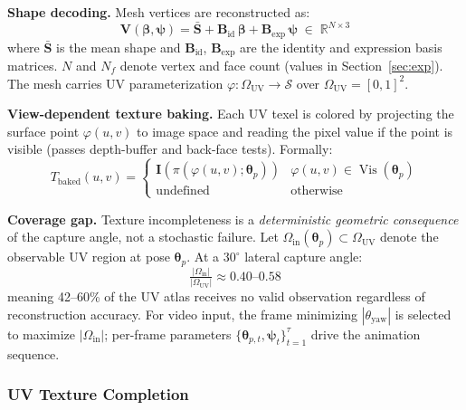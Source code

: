 \documentclass[conference]{IEEEtran}
\newcommand{\R}{\mathbb{R}}
\newcommand{\OUV}{\Omega_{\text{UV}}}
\newcommand{\Oin}{\Omega_{\text{in}}}
\newcommand{\Vis}{\operatorname{Vis}}
\newcommand{\Tbaked}{T_{\text{baked}}}
\begin{document}
\medskip\noindent\textbf{Shape decoding.}
Mesh vertices are reconstructed as:
\begin{equation}
  \mathbf{V}(\bm{\beta}, \bm{\psi}) = \bar{\mathbf{S}}
    + \mathbf{B}_{\text{id}}\,\bm{\beta} + \mathbf{B}_{\text{exp}}\,\bm{\psi}
  \;\in\; \R^{N \times 3}
  \label{eq:shape_decode}
\end{equation}
where $\bar{\mathbf{S}}$ is the mean shape and $\mathbf{B}_{\text{id}}$,
$\mathbf{B}_{\text{exp}}$ are the identity and expression basis matrices.
$N$ and $N_f$ denote vertex and face count (values in Section~\ref{sec:exp}).
The mesh carries UV parameterization $\varphi\colon \OUV \to \mathcal{S}$
over $\OUV = [0,1]^2$.

\medskip\noindent\textbf{View-dependent texture baking.}
Each UV texel is colored by projecting the surface point $\varphi(u,v)$ to
image space and reading the pixel value if the point is visible (passes
depth-buffer and back-face tests). Formally:
\begin{equation}
  \Tbaked(u,v) =
  \begin{cases}
    \mathbf{I}(\pi(\varphi(u,v);\bm{\theta}_p))
      & \varphi(u,v) \in \Vis(\bm{\theta}_p) \\
    \text{undefined} & \text{otherwise}
  \end{cases}
  \label{eq:baking}
\end{equation}

\medskip\noindent\textbf{Coverage gap.}
Texture incompleteness is a \emph{deterministic geometric consequence} of the
capture angle, not a stochastic failure. Let $\Oin(\bm{\theta}_p) \subset \OUV$
denote the observable UV region at pose $\bm{\theta}_p$. At a $30^{\circ}$
lateral capture angle:
\begin{equation}
  \tfrac{|\Oin|}{|\OUV|} \approx 0.40\text{--}0.58
  \label{eq:coverage_gap}
\end{equation}
meaning 42--60\% of the UV atlas receives no valid observation regardless of
reconstruction accuracy. For video input, the frame minimizing
$|\theta_{\text{yaw}}|$ is selected to maximize $|\Oin|$; per-frame parameters
$\{\bm{\theta}_{p,t}, \bm{\psi}_t\}_{t=1}^{\tau}$ drive the animation sequence.

\subsubsection{UV Texture Completion}
\end{document}
